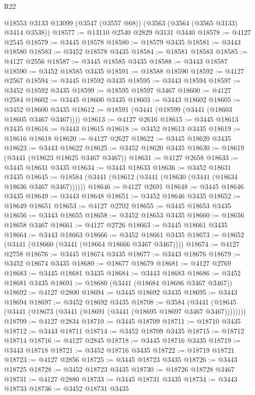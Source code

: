 \begin{lexlean}{R22}
\begin{coremodule}
    @18553
    @3133
    @13099
    (@3547 (@3557 @68))
    (@3563 (@3564 (@3565 @3133) @3414 @3538))
@18577 := @13110 @2540 @2829 @3131 @3440
@18578 := @4127 @2545
@18579 := @3445 @18578
@18580 := @18579 @3435
@18581 := @3443 @18580
@18583 := @3452 @18578 @3435
@18584 := @18581 @18583
@18585 := @4127 @2556
@18587 := @3445 @18585 @3435
@18588 := @3443 @18587
@18590 := @3452 @18585 @3435
@18591 := @18588 @18590
@18592 := @4127 @2567
@18594 := @3445 @18592 @3435
@18595 := @3443 @18594
@18597 := @3452 @18592 @3435
@18599 := @18595 @18597 @3467
@18600 := @4127 @2584
@18602 := @3445 @18600 @3435
@18603 := @3443 @18602
@18605 := @3452 @18600 @3435
@18612 := @18591 (@3441 (@18599 (@3441 (@18603 @18605 @3467 @3467))))
@18613 := @4127 @2616
@18615 := @3445 @18613 @3435
@18616 := @3443 @18615
@18618 := @3452 @18613 @3435
@18619 := @18616 @18618
@18620 := @4127 @2627
@18622 := @3445 @18620 @3435
@18623 := @3443 @18622
@18625 := @3452 @18620 @3435
@18630 := @18619 (@3441 (@18623 @18625 @3467 @3467))
@18631 := @4127 @2658
@18633 := @3445 @18631 @3435
@18634 := @3443 @18633
@18636 := @3452 @18631 @3435
@18645 := @18584 (@3441 (@18612 (@3441 (@18630 (@3441 (@18634 @18636 @3467 @3467))))))
@18646 := @4127 @2691
@18648 := @3445 @18646 @3435
@18649 := @3443 @18648
@18651 := @3452 @18646 @3435
@18652 := @18649 @18651
@18653 := @4127 @2702
@18655 := @3445 @18653 @3435
@18656 := @3443 @18655
@18658 := @3452 @18653 @3435
@18660 := @18656 @18658 @3467
@18661 := @4127 @2726
@18663 := @3445 @18661 @3435
@18664 := @3443 @18663
@18666 := @3452 @18661 @3435
@18673 := @18652 (@3441 (@18660 (@3441 (@18664 @18666 @3467 @3467))))
@18674 := @4127 @2758
@18676 := @3445 @18674 @3435
@18677 := @3443 @18676
@18679 := @3452 @18674 @3435
@18680 := @18677 @18679
@18681 := @4127 @2769
@18683 := @3445 @18681 @3435
@18684 := @3443 @18683
@18686 := @3452 @18681 @3435
@18691 := @18680 (@3441 (@18684 @18686 @3467 @3467))
@18692 := @4127 @2800
@18694 := @3445 @18692 @3435
@18695 := @3443 @18694
@18697 := @3452 @18692 @3435
@18708 := @3584
    (@3441 (@18645 (@3441 (@18673 (@3441 (@18691 (@3441 (@18695 @18697 @3467 @3467))))))))
@18709 := @4127 @2834
@18710 := @3445 @18709
@18711 := @18710 @3435
@18712 := @3443 @18711
@18714 := @3452 @18709 @3435
@18715 := @18712 @18714
@18716 := @4127 @2845
@18718 := @3445 @18716 @3435
@18719 := @3443 @18718
@18721 := @3452 @18716 @3435
@18722 := @18719 @18721
@18723 := @4127 @2856
@18725 := @3445 @18723 @3435
@18726 := @3443 @18725
@18728 := @3452 @18723 @3435
@18730 := @18726 @18728 @3467
@18731 := @4127 @2880
@18733 := @3445 @18731 @3435
@18734 := @3443 @18733
@18736 := @3452 @18731 @3435

\end{coremodule}
\end{lexlean}
